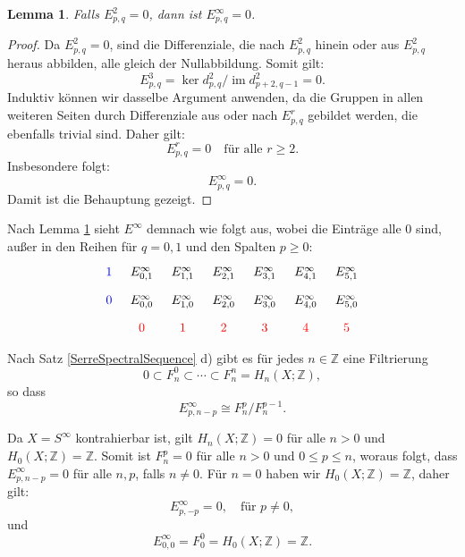 \documentclass[12pt]{article}
\numberwithin{conj}{section}
\newtheorem{lemma}[conj]{Lemma}
\begin{document}
    \begin{lemma}
        \label{lemma:infinitysection} Falls $E^{2}_{p,q}= 0$, dann ist
        $E^{\infty}_{p,q}= 0$.
    \end{lemma}

    \begin{proof}
        Da $E^{2}_{p,q}= 0$, sind die Differenziale, die nach $E^{2}_{p,q}$ hinein oder
        aus $E^{2}_{p,q}$ heraus abbilden, alle gleich der Nullabbildung. Somit gilt:
        \[
            E^{3}_{p,q}= \ker d^{2}_{p,q}  / \operatorname{im} d^{2}_{p+2,q-1} = 0.
        \]
        Induktiv können wir dasselbe Argument anwenden, da die Gruppen in allen weiteren
        Seiten durch Differenziale aus oder nach $E^{r}_{p,q}$ gebildet werden, die
        ebenfalls trivial sind. Daher gilt:
        \[
            E^{r}_{p,q}= 0 \quad \text{für alle }r \geq 2.
        \]
        Insbesondere folgt:
        \[
            E^{\infty}_{p,q}= 0.
        \]
        Damit ist die Behauptung gezeigt.
    \end{proof}

    Nach Lemma \ref{lemma:infinitysection} sieht $E^{\infty}$ demnach wie folgt
    aus, wobei die Einträge alle $0$ sind, außer in den Reihen für $q = 0,1$ und
    den Spalten $p \geq 0$:
    \[
        \begin{tikzcd}
            [sep=tiny] {\color{blue}1} & {E^\infty_{0,1}} & {E^\infty_{1,1}} & {E^\infty_{2,1}}
            & {E^\infty_{3,1}} & {E^\infty_{4,1}} & {E^\infty_{5,1}} \\ {\color{blue}0}
            & {E^\infty_{0,0}} & {E^\infty_{1,0}} & {E^\infty_{2,0}} & {E^\infty_{3,0}}
            & {E^\infty_{4,0}} & {E^\infty_{5,0}} \\ & {\color{red}0} & {\color{red}1}
            & {\color{red}2} & {\color{red}3} & {\color{red}4} & {\color{red}5}
        \end{tikzcd}
    \]

    Nach Satz \ref{SerreSpectralSequence} d) gibt es für jedes
    $n \in \mathbb{Z}$ eine Filtrierung
    \[
        0 \subset F^{0}_{n} \subset \cdots \subset F^{n}_{n} = H_{n}(X;\mathbb{Z}),
    \]
    so dass
    \[
        E^{\infty}_{p,n-p}\cong F_{n}^{p} / F_{n}^{p-1}.
    \]

    Da $X = S^{\infty}$ kontrahierbar ist, gilt $H_{n}(X;\mathbb{Z}) = 0$ für alle
    $n > 0$ und $H_{0}(X;\mathbb{Z}) = \mathbb{Z}$. Somit ist $F_{n}^{p} = 0$ für alle
    $n > 0$ und $0 \leq p \leq n$, woraus folgt, dass $E^{\infty}_{p,n-p}= 0$ für alle
    $n,p$, falls $n \neq 0$. Für $n = 0$ haben wir $H_{0}(X;\mathbb{Z}) = \mathbb{Z}$, daher gilt:
    \[
        E^{\infty}_{p,-p}= 0, \quad \text{für }p \neq 0,
    \]
    und
    \[
        E^{\infty}_{0,0}= F_{0}^{0} = H_{0}(X;\mathbb{Z}) = \mathbb{Z}.
    \]
\end{document}
